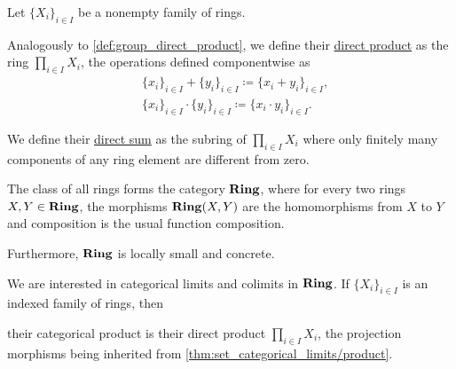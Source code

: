 \begin{definition}\label{def:ring_direct_product}
  Let $\{ X_i \}_{i \in I}$ be a nonempty family of rings.

  Analogously to \cref{def:group_direct_product}, we define their \uline{direct product} as the ring $\prod_{i \in I} X_i$, the operations defined componentwise as
  \begin{align*}
    &\{ x_i \}_{i \in I} + \{ y_i \}_{i \in I}
    \coloneqq
    \{ x_i + y_i \}_{i \in I}, \\
    &\{ x_i \}_{i \in I} \cdot \{ y_i \}_{i \in I}
    \coloneqq
    \{ x_i \cdot y_i \}_{i \in I}.
  \end{align*}

  We define their \uline{direct sum} as the subring of $\prod_{i \in I} X_i$ where only finitely many components of any ring element are different from zero.
\end{definition}

\begin{definition}\label{def:category_of_ring}
  The class of all rings forms the category $\operatorname{\mathbf{Ring}}$, where for every two rings $X, Y \in \operatorname{\mathbf{Ring}}$, the morphisms $\operatorname{\mathbf{Ring}}(X, Y)$ are the homomorphisms from $X$ to $Y$ and composition is the usual function composition.

  Furthermore, $\operatorname{\mathbf{Ring}}$ is locally small and concrete.
\end{definition}

\begin{proposition}\label{thm:ring_categorical_limits}
  We are interested in categorical limits and colimits in $\operatorname{\mathbf{Ring}}$. If $\{ X_i \}_{i \in I}$ is an indexed family of rings, then
  \begin{defenum}
    \item\label{thm:ring_categorical_limits/product} their categorical product is their direct product $\prod_{i \in I} X_i$, the projection morphisms being inherited from \cref{thm:set_categorical_limits/product}.
  \end{defenum}
\end{proposition}
